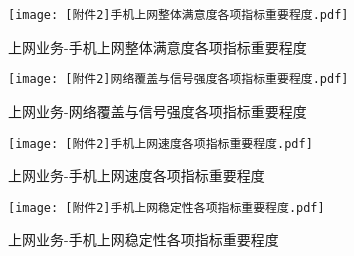 \documentclass{MathorCupmodeling}
\begin{document}
	\begin{figure}[H]
		\centerline{\texttt{[image: [附件2]手机上网整体满意度各项指标重要程度.pdf]}}
		\caption{上网业务-手机上网整体满意度各项指标重要程度}\label{fig:a2FirstRF}
	\end{figure}
	\begin{figure}[H]
		\centerline{\texttt{[image: [附件2]网络覆盖与信号强度各项指标重要程度.pdf]}}
		\caption{上网业务-网络覆盖与信号强度各项指标重要程度}\label{fig:a2SecondRF}
	\end{figure}
	\begin{figure}[H]
		\centerline{\texttt{[image: [附件2]手机上网速度各项指标重要程度.pdf]}}
		\caption{上网业务-手机上网速度各项指标重要程度}\label{fig:a2ThirdRF}
	\end{figure}
	\begin{figure}[H]
		\centerline{\texttt{[image: [附件2]手机上网稳定性各项指标重要程度.pdf]}}
		\caption{上网业务-手机上网稳定性各项指标重要程度}\label{fig:a2FourthRF}
	\end{figure}
\end{document}
